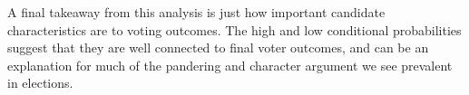 \documentclass[
]{article}
\begin{document}
A final takeaway from this analysis is just how important candidate
characteristics are to voting outcomes. The high and low conditional
probabilities suggest that they are well connected to final voter
outcomes, and can be an explanation for much of the pandering and
character argument we see prevalent in elections.
\end{document}
